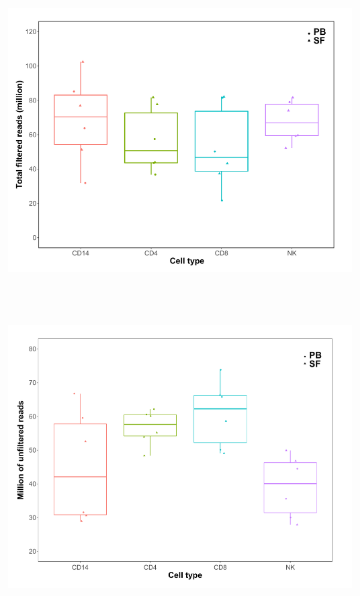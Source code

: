  
\bigskip
\begin{figure}[H]
\centering
\begin{subfigure}[b]{0.48\textwidth}
\centering 
\includegraphics[width=\textwidth]{./Results3/pdfs/ATAC_PSA_total_filtered_reads_boxplot}
\caption{}
\end{subfigure}
~
\begin{subfigure}[b]{0.48\textwidth}
\centering 
\includegraphics[width=\textwidth]{./Results3/pdfs/ATAC_PSA_pcnt_dups_and_MT_reads_boxplot}
\caption{}
\end{subfigure}
~
\begin{subfigure}[b]{0.48\textwidth} 
\centering

\end{subfigure}
\end{figure}
